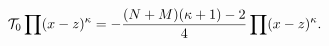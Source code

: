 \begin{equation}
	{\cal T_{\rm 0}}\prod (x-z)^{\kappa}=-\frac{(N+M)(\kappa+1)-2}{4}
	\prod (x-z)^{\kappa} .
\end{equation}

